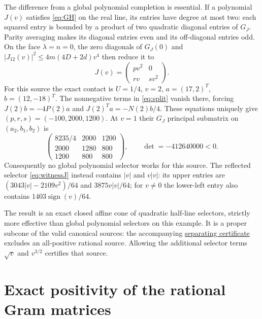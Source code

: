\documentclass[11pt]{article}
\begin{document}
The difference from a global polynomial completion is essential.
If a polynomial $J(v)$ satisfies \eqref{eq:GH} on the real line, its entries
have degree at most two: each squared entry is bounded by a product of
two quadratic diagonal entries of $G_J$. Parity averaging makes its
diagonal entries even and its off-diagonal entries odd. On the face
$\lambda=n=0$, the zero diagonals of $G_J(0)$ and
$|J_{12}(v)|^2\le4m(4D+2d)v^4$ then reduce it to
\[
 J(v)=\begin{pmatrix}pv^2&0\\rv&sv^2\end{pmatrix}.
\]
For this source the exact contact is
$U=1/4$, $v=2$, $a=(17,2)^T$, $b=(12,-18)^T$.
The nonnegative terms in \eqref{eq:split} vanish there, forcing
$J(2)b=-4P(2)a$ and $J(2)^Ta=-N(2)b/4$.
These equations uniquely give $(p,r,s)=(-100,2000,1200)$.
At $v=1$ their $G_J$ principal submatrix on $(a_2,b_1,b_2)$ is
\[
 \begin{pmatrix}8235/4&2000&1200\\2000&1280&800\\1200&800&800\end{pmatrix},
 \qquad \det=-412640000<0.
\]
Consequently no global polynomial selector works for this source.
The reflected selector \eqref{eq:witnessJ} instead contains $|v|$ and
$v|v|$: its upper entries are
$(3043|v|-2109v^2)/64$ and $3875v|v|/64$; for $v\ne0$ the lower-left
entry also contains $1403\operatorname{sign}(v)/64$.

The result is an exact closed affine cone of quadratic half-line selectors,
strictly more effective than global polynomial selectors on this example.
It is a proper subcone of the valid canonical sources: the accompanying
\href{https://github.com/anubhav70747/q222-finite-sdp/tree/main/extracted-lifts/canonical-completion/ramified-completion}{separating certificate}
excludes an all-positive rational source. Allowing the additional selector
terms $\sqrt v$ and $v^{3/2}$ certifies that source.

\clearpage
\appendix
\section{Exact positivity of the rational Gram matrices}
\end{document}
